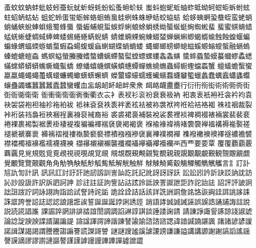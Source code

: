蚉󠄀蚊󠄀蚊󠄁蚋󠄀蚌󠄀蚍󠄀蚑󠄀蚓󠄀蚕󠄀蚖󠄀蚘󠄀蚚󠄀蚜󠄀蚝󠄀蚡󠄀蚣󠄀蚤󠄀蚦󠄀蚧󠄀蚨󠄀
蚩󠄀蚪󠄀蚫󠄀蚭󠄀蚯󠄀蚰󠄀蚱󠄀蚳󠄀蚴󠄀蚵󠄀蚶󠄀蚷󠄀蚸󠄀蚹󠄀蚿󠄀蛀󠄀蛁󠄀蛃󠄀蛄󠄀蛅󠄀
蛆󠄀蛇󠄀蛉󠄀蛋󠄀蛍󠄀蛎󠄀蛑󠄀蛒󠄀蛔󠄀蛕󠄀蛗󠄀蛙󠄀蛚󠄀蛛󠄀蛛󠄁蛜󠄀蛞󠄀蛟󠄀蛠󠄀蛣󠄀
蛤󠄀蛥󠄀蛦󠄀蛧󠄀蛩󠄀蛬󠄀蛭󠄀蛮󠄀蛯󠄀蛸󠄀蛸󠄁蛹󠄀蛺󠄀蛻󠄀蛼󠄀蛽󠄀蛾󠄀蜀󠄀蜂󠄀蜃󠄀
蜃󠄁蜄󠄀蜅󠄀蜆󠄀蜇󠄀蜈󠄀蜉󠄀蜊󠄀蜋󠄀蜍󠄀蜎󠄀蜏󠄀蜐󠄀蜑󠄀蜒󠄀蜓󠄀蜔󠄀蜘󠄀蜙󠄀蜚󠄀
蜚󠄁蜜󠄀蜞󠄀蜟󠄀蜡󠄀蜢󠄀蜣󠄀蜥󠄀蜨󠄀蜩󠄀蜮󠄀蜯󠄀蜱󠄀蜲󠄀蜴󠄀蜷󠄀蜷󠄁蜹󠄀蜺󠄀蜻󠄀
蜻󠄁蜼󠄀蜽󠄀蜾󠄀蜿󠄀蝀󠄀蝃󠄀蝅󠄀蝉󠄀蝋󠄀蝌󠄀蝍󠄀蝎󠄀蝑󠄀蝓󠄀蝕󠄀蝕󠄁蝗󠄀蝘󠄀蝙󠄀
蝙󠄁蝝󠄀蝟󠄀蝠󠄀蝡󠄀蝣󠄀蝤󠄀蝥󠄀蝦󠄀蝨󠄀蝪󠄀蝮󠄀蝯󠄀蝱󠄀蝲󠄀蝴󠄀蝶󠄀蝸󠄀蝻󠄀蝼󠄀
蝿󠄀螂󠄀螂󠄁螃󠄀螄󠄀螅󠄀螆󠄀螇󠄀螈󠄀螉󠄀螋󠄀螌󠄀融󠄀螎󠄀螐󠄀螓󠄀螕󠄀螗󠄀螘󠄀螙󠄀
螞󠄀螟󠄀螠󠄀螢󠄀螣󠄀螣󠄁螧󠄀螫󠄀螬󠄀螭󠄀螮󠄀螯󠄀螱󠄀螳󠄀螵󠄀螺󠄀螻󠄀螽󠄀螽󠄁螾󠄀
螿󠄀蟀󠄀蟁󠄀蟄󠄀蟆󠄀蟇󠄀蟈󠄀蟉󠄀蟊󠄀蟋󠄀蟎󠄀蟐󠄀蟒󠄀蟒󠄁蟒󠄂蟕󠄀蟖󠄀蟙󠄀蟚󠄀蟜󠄀
蟟󠄀蟠󠄀蟢󠄀蟣󠄀蟤󠄀蟥󠄀蟦󠄀蟪󠄀蟫󠄀蟬󠄀蟭󠄀蟯󠄀蟱󠄀蟲󠄀蟳󠄀蟵󠄀蟶󠄀蟷󠄀蟸󠄀蟹󠄀
蟺󠄀蟻󠄀蟾󠄀蟿󠄀蠁󠄀蠃󠄀蠃󠄁蠅󠄀蠅󠄁蠅󠄂蠆󠄀蠇󠄀蠉󠄀蠊󠄀蠋󠄀蠍󠄀蠎󠄀蠎󠄁蠏󠄀蠐󠄀
蠑󠄀蠒󠄀蠓󠄀蠔󠄀蠕󠄀蠖󠄀蠘󠄀蠙󠄀蠚󠄀蠛󠄀蠜󠄀蠞󠄀蠟󠄀蠡󠄀蠢󠄀蠣󠄀蠧󠄀蠨󠄀蠭󠄀蠮󠄀
蠰󠄀蠱󠄀蠲󠄀蠵󠄀蠶󠄀蠶󠄁蠶󠄂蠹󠄀蠺󠄀蠻󠄀蠼󠄀血󠄀衁󠄀衂󠄀衂󠄁衃󠄀衄󠄀衅󠄀衆󠄀衆󠄁
衈󠄀衉󠄀衊󠄀衋󠄀衋󠄁行󠄀衍󠄀衎󠄀衑󠄀衒󠄀術󠄀術󠄁衕󠄀衖󠄀街󠄀衘󠄀衙󠄀衚󠄀衛󠄀衛󠄁
衜󠄀衝󠄀衞󠄀衞󠄁衟󠄀衠󠄀衡󠄀衢󠄀衣󠄀衣󠄁衤󠄀表󠄀衩󠄀衫󠄀衮󠄀衯󠄀衰󠄀衰󠄁衱󠄀衲󠄀
衵󠄀衷󠄀衷󠄁衹󠄀衻󠄀衽󠄀衾󠄀衿󠄀袀󠄀袁󠄀袂󠄀袈󠄀袋󠄀袍󠄀袒󠄀袖󠄀袗󠄀袘󠄀袙󠄀袚󠄀
袛󠄀袜󠄀袞󠄀袞󠄁袟󠄀袠󠄀袢󠄀袤󠄀袨󠄀袪󠄀被󠄀袮󠄀袰󠄀袱󠄀袴󠄀袵󠄀袷󠄀袺󠄀袼󠄀袽󠄀
袾󠄀袿󠄀裀󠄀裁󠄀裂󠄀裃󠄀裄󠄀装󠄀裆󠄀裊󠄀裋󠄀裌󠄀裍󠄀裎󠄀裏󠄀裑󠄀裒󠄀裓󠄀裔󠄀裕󠄀
裘󠄀裘󠄁裙󠄀裛󠄀補󠄀裝󠄀裞󠄀裟󠄀裠󠄀裡󠄀裧󠄀裨󠄀裯󠄀裰󠄀裱󠄀裲󠄀裳󠄀裴󠄀裴󠄁裵󠄀
裷󠄀裸󠄀裹󠄀裼󠄀製󠄀裾󠄀褁󠄀褂󠄀褄󠄀褆󠄀複󠄀褊󠄀褊󠄁褌󠄀褍󠄀褎󠄀褏󠄀褐󠄀褐󠄁褒󠄀
褓󠄀褕󠄀褖󠄀褘󠄀褙󠄀褚󠄀褜󠄀褜󠄁褝󠄀褞󠄀褠󠄀褥󠄀褦󠄀褧󠄀褨󠄀褪󠄀褫󠄀褫󠄁褰󠄀褱󠄀
褲󠄀褵󠄀褶󠄀褷󠄀褸󠄀褹󠄀褺󠄀褻󠄀褻󠄁褾󠄀襀󠄀襁󠄀襁󠄁襂󠄀襃󠄀襄󠄀襅󠄀襆󠄀襉󠄀襌󠄀
襍󠄀襏󠄀襒󠄀襖󠄀襖󠄁襗󠄀襚󠄀襛󠄀襜󠄀襞󠄀襟󠄀襠󠄀襡󠄀襢󠄀襣󠄀襤󠄀襦󠄀襪󠄀襪󠄁襫󠄀
襭󠄀襮󠄀襯󠄀襯󠄁襰󠄀襲󠄀襳󠄀襴󠄀襵󠄀襷󠄀襺󠄀襻󠄀襼󠄀襽󠄀襾󠄀西󠄀覀󠄀要󠄀要󠄁覃󠄀
覆󠄀覆󠄁覇󠄀覇󠄁覈󠄀覉󠄀覊󠄀見󠄀覍󠄀規󠄀覐󠄀覓󠄀覔󠄀覕󠄀視󠄀視󠄁覗󠄀覘󠄀覚󠄀覛󠄀
覜󠄀覟󠄀覠󠄀覡󠄀覥󠄀覦󠄀覧󠄀覩󠄀親󠄀親󠄁覬󠄀覯󠄀覯󠄁覰󠄀覲󠄀観󠄀覴󠄀覵󠄀覶󠄀覷󠄀
覺󠄀覼󠄀覽󠄀覽󠄁覿󠄀觀󠄀角󠄀角󠄁觔󠄀觕󠄀觖󠄀觗󠄀觘󠄀觚󠄀觜󠄀觝󠄀解󠄀觥󠄀触󠄀觧󠄀
觩󠄀觫󠄀觭󠄀觱󠄀觳󠄀觴󠄀觶󠄀觸󠄀觹󠄀觽󠄀觿󠄀言󠄀訁󠄀訂󠄀訃󠄀訄󠄀訅󠄀訇󠄀計󠄀訊󠄀
訊󠄁訊󠄂訌󠄀討󠄀訏󠄀訐󠄀訑󠄀訒󠄀訒󠄁訓󠄀訔󠄀訕󠄀訖󠄀託󠄀記󠄀訛󠄀訝󠄀訝󠄁訝󠄂訞󠄀
訟󠄀訟󠄁訠󠄀訡󠄀訢󠄀訣󠄀訤󠄀訥󠄀訦󠄀訪󠄀訫󠄀訬󠄀設󠄀訯󠄀許󠄀訳󠄀訴󠄀訵󠄀訶󠄀訷󠄀
診󠄀註󠄀註󠄁証󠄀訽󠄀訾󠄀詀󠄀詁󠄀詃󠄀詅󠄀詆󠄀詇󠄀詈󠄀詉󠄀詍󠄀詎󠄀詐󠄀詑󠄀詒󠄀詓󠄀
詔󠄀評󠄀評󠄁詖󠄀詗󠄀詘󠄀詛󠄀詜󠄀詝󠄀詞󠄀詠󠄀詡󠄀詢󠄀詣󠄀詥󠄀試󠄀詧󠄀詩󠄀詫󠄀詬󠄀
詭󠄀詮󠄀詮󠄁詰󠄀話󠄀該󠄀詳󠄀詵󠄀詶󠄀詷󠄀詹󠄀詺󠄀詻󠄀詼󠄀詾󠄀詿󠄀誀󠄀誂󠄀誃󠄀誄󠄀
誅󠄀誆󠄀誇󠄀誉󠄀誋󠄀誌󠄀認󠄀認󠄁誏󠄀誐󠄀誑󠄀誒󠄀誓󠄀誕󠄀誕󠄁誕󠄂誖󠄀誗󠄀誘󠄀誙󠄀
誚󠄀語󠄀誟󠄀誠󠄀誠󠄁誡󠄀誣󠄀誤󠄀誤󠄁誥󠄀誦󠄀誧󠄀誨󠄀誩󠄀說󠄀説󠄀読󠄀誮󠄀誯󠄀誰󠄀
課󠄀誳󠄀誶󠄀誷󠄀誹󠄀誹󠄁誻󠄀誼󠄀誾󠄀調󠄀調󠄁諂󠄀諃󠄀諄󠄀諆󠄀談󠄀諈󠄀諉󠄀諊󠄀請󠄀
請󠄁諌󠄀諍󠄀諏󠄀諐󠄀諑󠄀諒󠄀諓󠄀諔󠄀諕󠄀論󠄀諗󠄀諚󠄀諛󠄀諛󠄁諜󠄀諝󠄀諞󠄀諞󠄁諟󠄀
諠󠄀諡󠄀諢󠄀諤󠄀諦󠄀諧󠄀諫󠄀諬󠄀諭󠄀諭󠄁諮󠄀諮󠄁諮󠄂諰󠄀諱󠄀諳󠄀諴󠄀諵󠄀諶󠄀諷󠄀
諸󠄀諸󠄁諺󠄀諺󠄁諼󠄀諾󠄀諿󠄀謀󠄀謁󠄀謁󠄁謂󠄀謄󠄀謄󠄁謅󠄀謆󠄀謇󠄀謊󠄀謋󠄀謌󠄀謍󠄀
謎󠄀謎󠄁謏󠄀謐󠄀謑󠄀謔󠄀謖󠄀謗󠄀謙󠄀謙󠄁謚󠄀講󠄀講󠄁謜󠄀謝󠄀謝󠄁謞󠄀謟󠄀謠󠄀謡󠄀
謦󠄀謨󠄀謫󠄀謬󠄀謬󠄁謭󠄀謰󠄀謳󠄀謷󠄀謹󠄀謹󠄁謼󠄀謾󠄀謾󠄁譁󠄀譁󠄁譂󠄀譃󠄀譄󠄀譅󠄀
